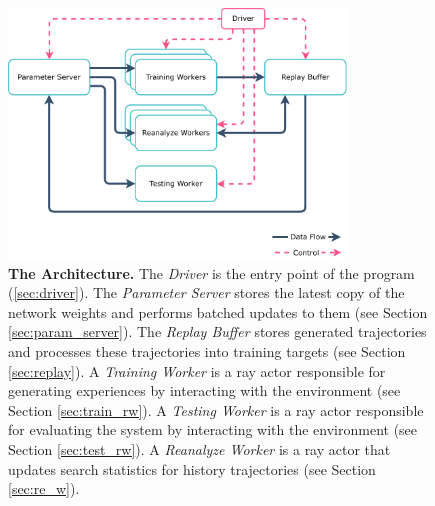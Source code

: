 \begin{figure}[htbp]
    \captionsetup{width=\textwidth}
    \centering
    \includegraphics[width=0.8\textwidth, height=0.8\textheight,keepaspectratio]{assets/moozi_architecture.pdf}
    \caption[\textbf{The \moozi Architecture.}]{
        \textbf{The \moozi Architecture.}
        The \textit{Driver} is the entry point of the program (\ref{sec:driver}).
        The \textit{Parameter Server} stores the latest copy of the network weights and performs batched updates to them (see Section \ref{sec:param_server}).
        The \textit{Replay Buffer} stores generated trajectories and processes these trajectories into training targets (see Section \ref{sec:replay}).
        A \textit{Training Worker} is a ray actor responsible for generating experiences by interacting with the environment (see Section \ref{sec:train_rw}).
        A \textit{Testing Worker} is a ray actor responsible for evaluating the system by interacting with the environment (see Section \ref{sec:test_rw}).
        A \textit{Reanalyze Worker} is a ray actor that updates search statistics for history trajectories (see Section \ref{sec:re_w}).
    }
    \label{fig:moozi_architecture}
\end{figure}


